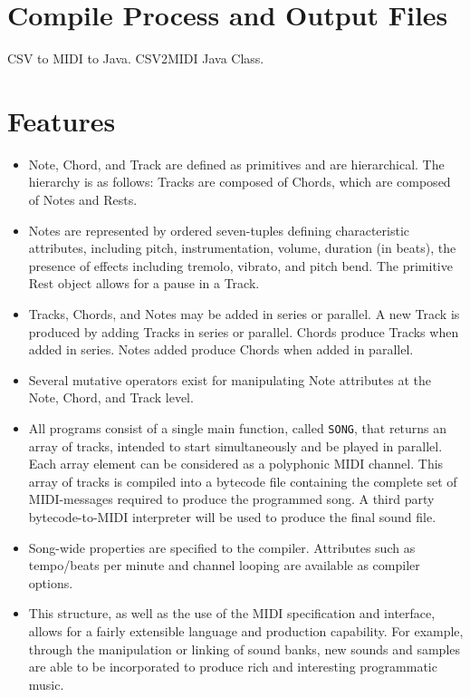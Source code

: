 \documentclass[letterpaper]{article}
\begin{document}
\section{Compile Process and Output Files}
CSV to MIDI to Java. CSV2MIDI Java Class. 

\section{Features}

\begin{itemize}
\item
Note, Chord, and Track are defined as primitives and are hierarchical. The hierarchy is as follows: Tracks are composed of Chords, which are composed of Notes and Rests.
\item
Notes are represented by ordered seven-tuples defining characteristic attributes, including pitch, instrumentation, volume, duration (in beats), the presence of effects including tremolo, vibrato, and pitch bend. The primitive Rest object allows for a pause in a Track.
\item
Tracks, Chords, and Notes may be added in series or parallel. A new Track is produced by adding Tracks in series or parallel. Chords produce Tracks when added in series. Notes added produce Chords when added in parallel.
\item
Several mutative operators exist for manipulating Note attributes at the Note, Chord, and Track level.
\item
All programs consist of a single main function, called \texttt{SONG}, that returns an array of tracks, intended to start simultaneously and be played in parallel. Each array element can be considered as a polyphonic MIDI channel. This array of tracks is compiled into a bytecode file containing the complete set of MIDI-messages required to produce the programmed song. A third party bytecode-to-MIDI interpreter will be used to produce the final sound file.
\item
Song-wide properties are specified to the compiler. Attributes such as tempo/beats per minute and channel looping are available as compiler options.
\item
This structure, as well as the use of the MIDI specification and interface, allows for a fairly extensible language and production capability. For example, through the manipulation or linking of sound banks, new sounds and samples are able to be incorporated to produce rich and interesting programmatic music.
\end{itemize}
\end{document}
